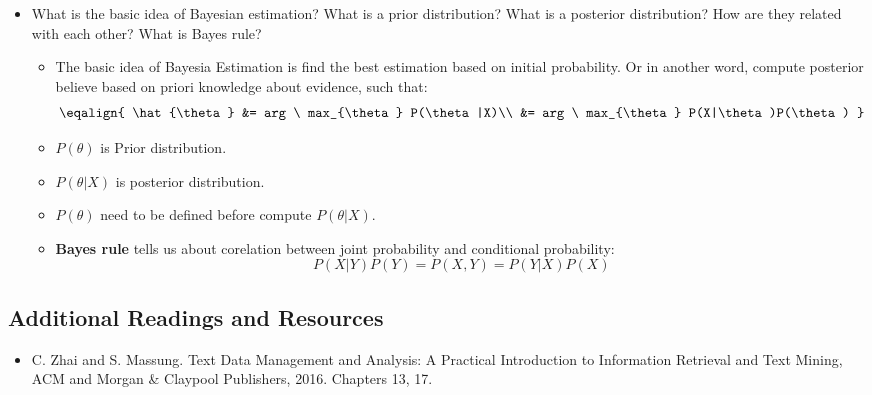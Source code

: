 \documentclass[11pt]{article}
\providecommand{\tightlist}{%
      \setlength{\itemsep}{0pt}\setlength{\parskip}{0pt}}
\begin{document}
    \begin{itemize}
\tightlist
\item
  What is the basic idea of Bayesian estimation? What is a prior
  distribution? What is a posterior distribution? How are they related
  with each other? What is Bayes rule?

  \begin{itemize}
  \tightlist
  \item
    The basic idea of Bayesia Estimation is find the best estimation
    based on initial probability. Or in another word, compute posterior
    believe based on priori knowledge about evidence, such that:
    \[\eqalign{
    \hat{\theta} &= arg \ max_{\theta} P(\theta|X)\\
             &= arg \ max_{\theta} P(X|\theta)P(\theta)
    }\] 
  \item
    \(P(\theta)\) is Prior distribution.
  \item
    \(P(\theta|X)\) is posterior distribution.
  \item
    \(P(\theta)\) need to be defined before compute \(P(\theta|X)\).
  \item
    \textbf{Bayes rule} tells us about corelation between joint
    probability and conditional probability:
    \[P(X|Y)P(Y) = P(X,Y) = P(Y|X)P(X)\] 
  \end{itemize}
\end{itemize}

    \subsection{Additional Readings and
Resources}\label{additional-readings-and-resources}

\begin{itemize}
\tightlist
\item
  C. Zhai and S. Massung. Text Data Management and Analysis: A Practical
  Introduction to Information Retrieval and Text Mining, ACM and Morgan
  \& Claypool Publishers, 2016. Chapters 13, 17.
\end{itemize}


    
    
    
    
\end{document}
